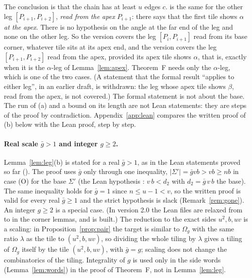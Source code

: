 \documentclass[11pt,reqno]{amsart}
\theoremstyle{plain}
\theoremstyle{definition}
\begin{document}
The conclusion is that the chain has at least $u$ edges $c$.  is the same for the other leg $[P_{i+1},P_{i+2}]$, \emph{read from the apex} $P_{i+1}$: there  says that the first tile shows $\alpha$ \emph{at the apex}. There is no hypothesis on the angle at the far end of the leg and none on the other leg. So the version  covers the leg $[P_i,P_{i+1}]$ read from its base corner, whatever tile sits at its apex end, and the version  covers the leg $[P_{i+1},P_{i+2}]$ read from the apex, provided its apex tile shows $\alpha$, that is, exactly when it is the $\alpha$-leg of Lemma~\ref{lem:apex}. Theorem~F needs only the $\alpha$-leg, which is one of the two cases. (A statement that the formal result ``applies to either leg'', in an earlier draft, is withdrawn: the leg whose apex tile shows $\beta$, read from the apex, is not covered.) The formal statement is not about the base. The run of (a) and a bound on its length are not Lean statements: they are steps of the proof by contradiction. Appendix~\ref{app:lean} compares the written proof of (b) below with the Lean proof, step by step.

\paragraph{Real scale $\bar g>1$ and integer $g\ge2$.} Lemma~\ref{lem:leg}(b) is stated for a real $\bar g>1$, as in the Lean statements proved so far (). The proof uses $\bar g$ only through one inequality, $|\Sigma'|=\bar gvb>vb\ge nb$ in case (O) for the base $\Sigma'$ (the Lean hypothesis : $v\,b<d_2$ with $d_2=\bar g\,v\,b$ the base). The same inequality holds for $\bar g=1$ since $n\le u-1<v$, so the written proof is valid for every real $\bar g\ge1$ and the strict hypothesis is slack (Remark~\ref{rem:gone}). An integer $g\ge2$ is a special case. (In version 2.0 the Lean files are relaxed from  to  in the corner lemmas, and  is built.) The reduction to the exact sides $u^2,b,uv$ is a scaling: in Proposition~\ref{prop:pair} the target is similar to $\Omega_{g}$ with the same ratio $\lambda$ as the tile to $(u^2,b,uv)$, so dividing the whole tiling by $\lambda$ gives a tiling of $\Omega_{g}$ itself by the tile $(u^2,b,uv)$, with $\bar g=g$; scaling does not change the combinatorics of the tiling. Integrality of $g$ is used only in the side words (Lemma~\ref{lem:words}) in the proof of Theorem~F, not in Lemma~\ref{lem:leg}.
\end{document}
